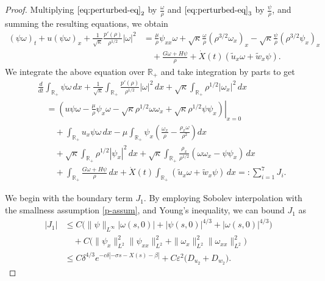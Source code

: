 \documentclass[11pt,reqno]{amsart}
\numberwithin{equation}{section} %
\begin{document}
\begin{proof}
Multiplying $\eqref{eq:perturbed-eq}_2$ by $\frac{\omega}{\rho}$ and $\eqref{eq:perturbed-eq}_3$ by $\frac{\psi}{\rho}$, and summing the resulting equations, we obtain 
\begin{align*}
(\psi \omega)_t + u (\psi \omega)_x + \frac{1}{\sqrt{\kappa}}\frac{p'(\rho)}{\rho^{1/2}} |\omega|^2
&= \frac{\mu}{\rho} \psi_{xx} \omega + \sqrt{\kappa} \frac{\omega}{\rho} (\rho^{3/2} \omega_x)_x - \sqrt{\kappa} \frac{\psi}{\rho} (\rho^{3/2} \psi_x)_x \\
&\quad + \frac{G \omega + H\psi }{\rho} + \dot{X}(t) (\tilde{u}_x \omega + \tilde{w}_x \psi ).
\end{align*}
We integrate the above equation over $\mathbb{R}_+$ and take integration by parts to get
\begin{equation*} %
\begin{aligned}
    &\frac{d}{dt} \int_{\mathbb{R}_+} \psi \omega \, dx + \frac{1}{\sqrt{\kappa}} \int_{\mathbb{R}_+} \frac{p'(\rho)}{\rho^{1/2}}  |\omega|^2 \,dx + \sqrt{\kappa} \int_{\mathbb{R}_+} \rho^{1/2} |\omega_x|^2 \,dx \nonumber \\
    &\quad =  \left. \left( u \psi \omega - \frac{\mu}{\rho} \psi_x \omega - \sqrt{\kappa} \rho^{1/2} \omega \omega_x + \sqrt{\kappa} \rho^{1/2} \psi \psi_x \right) \right|_{x=0} \nonumber \\
    &\qquad + \int_{\mathbb{R}_+} u_x \psi \omega \,dx - \mu \int_{\mathbb{R}_+}  \psi_x \left( \frac{\omega_x}{\rho} - \frac{\rho_x \omega}{\rho^2} \right) dx \nonumber \\
    &\qquad + \sqrt{\kappa} \int_{\mathbb{R}_+} \rho^{1/2} |\psi_x|^2 \,dx + \sqrt{\kappa} \int_{\mathbb{R}_+} \frac{\rho_x}{\rho^{1/2}} (\omega \omega_x - \psi \psi_x) \,dx \nonumber \\
    &\qquad + \int_{\mathbb{R}_+} \frac{G \omega + H\psi }{\rho} \,dx + \dot{X}(t) \int_{\mathbb{R}_+} (\tilde{u}_x \omega + \tilde{w}_x \psi ) \,dx =:\sum_{i=1}^7 J_i.
\end{aligned}
\end{equation*}

We begin with the boundary term $J_1$. By employing Sobolev interpolation with the smallness assumption \eqref{p-assum}, and Young's inequality, we can bound $J_1$ as
\begin{align*}
|J_1| 
&\le C  \bigl( \|\psi\|_{L^\infty} |\omega(s,0)| + |\psi(s,0)|^{4/3} +  |\omega(s,0)|^{4/3} \bigr) \\
&\quad + C \bigl( \| \psi_x \|_{L^2}^2 \| \psi_{xx}\|_{L^2}^{2} +  \|\omega_x\|_{L^2}^{2} \|\omega_{xx}\|_{L^2}^{2} \bigr)  \\
&\le C  \delta^{4/3} e^{-c\delta|-\sigma s - X(s) - \beta|}  + C \varepsilon^2 \bigl( D_{u_2} + D_{w_2} \bigr).
\end{align*}


\end{proof}
\end{document}
